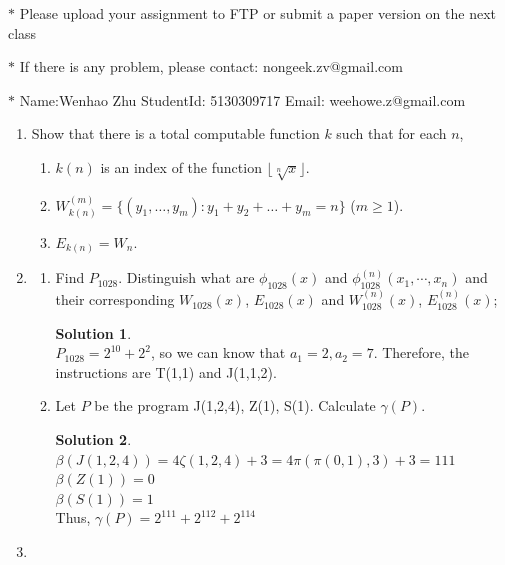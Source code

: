 \documentclass[12pt,a4paper]{article}
\theoremstyle{definition}
\newtheorem*{solution}{Solution}
\numberwithin{equation}{section}
\numberwithin{figure}{section}
\begin{document}
\noindent{}
\begin{center}
\footnotesize{\color{red}$*$ Please upload your assignment to FTP or submit a paper version on the next class}

\footnotesize{\color{red}$*$ If there is any problem, please contact: nongeek.zv@gmail.com }

\footnotesize{\color{blue}$*$ Name:Wenhao Zhu \quad StudentId: 5130309717 \quad Email: weehowe.z@gmail.com}
\end{center}


\begin{enumerate}%
  \item Show that there is a total computable function $k$ such that for each $n$,
    \begin{enumerate}
      \item $k(n)$ is an index of the function $\lfloor\sqrt[n]{x}\rfloor$.
      \item $W_{k(n)}^{(m)}=\{(y_{1},\ldots,y_{m}):y_{1}+y_{2}+\ldots+y_{m}=n\}$ ($m\geq 1$).
      \item $E_{k(n)}=W_n$.
    \end{enumerate}

  \item
  \begin{enumerate}
    \item Find $P_{1028}$. Distinguish what are $\phi_{1028}(x)$ and $\phi_{1028}^{(n)}(x_1,\cdots,x_n)$ and their corresponding $W_{1028}(x)$, $E_{1028}(x)$ and $W^{(n)}_{1028}(x)$, $E^{(n)}_{1028}(x)$;
    \begin{solution}
    $ $\\
    $P_{1028} = 2^{10} + 2^2$, so we can know that $a_1 = 2, a_2 = 7$.
    Therefore, the instructions are T(1,1) and J(1,1,2).
    \end{solution}
    \item Let $P$ be the program J(1,2,4), Z(1), S(1). Calculate $\gamma(P)$.
    \begin{solution} 
    $ $ \\
    $ \beta(J(1,2,4)) = 4\zeta(1,2,4) + 3 = 4\pi(\pi(0,1),3) + 3  = 111 $ \\
    $ \beta(Z(1)) = 0 $\\
    $ \beta(S(1)) = 1 $\\
    Thus, $\gamma(P) = 2^{111} + 2^{112} + 2^{114}$
    \end{solution}
  \end{enumerate}
\item


\end{enumerate}
\end{document}
